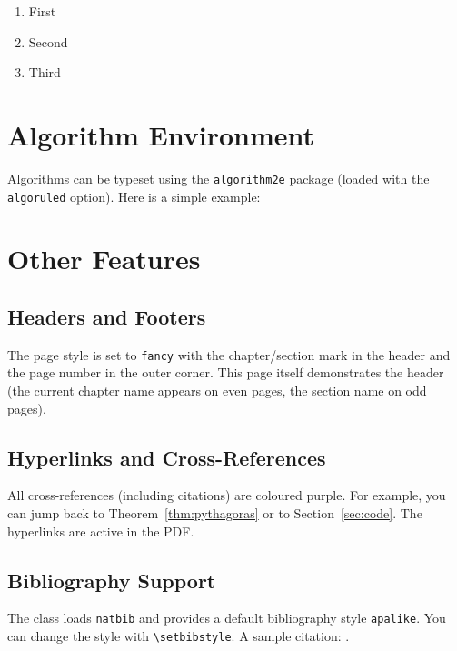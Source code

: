 \documentclass{myBook}
\begin{document}
\begin{enumerate}
    \item First
    \item Second
    \item Third
\end{enumerate}

\chapter{Algorithm Environment}
Algorithms can be typeset using the \texttt{algorithm2e} package (loaded with the \texttt{algoruled} option). Here is a simple example:


\begin{algorithm}[H]
\SetAlgoLined
{}
\caption{Recursive factorial}
\end{algorithm}

\chapter{Other Features}
\section{Headers and Footers}
The page style is set to \texttt{fancy} with the chapter/section mark in the header and the page number in the outer corner. This page itself demonstrates the header (the current chapter name appears on even pages, the section name on odd pages).

\section{Hyperlinks and Cross-References}
All cross-references (including citations) are coloured purple. For example, you can jump back to Theorem~\ref{thm:pythagoras} or to Section~\ref{sec:code}. The hyperlinks are active in the PDF.

\section{Bibliography Support}
The class loads \texttt{natbib} and provides a default bibliography style \texttt{apalike}. You can change the style with \texttt{\textbackslash setbibstyle}. A sample citation: \cite{knuth:1984}.



\end{document}
